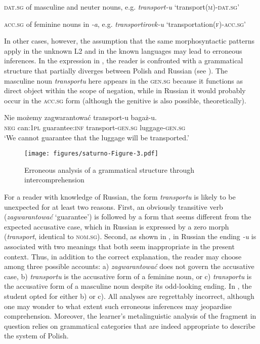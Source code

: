 \documentclass[output=paper,            colorlinks, citecolor=brown            		  ]{langscibook}
\begin{document}
\ea\label{ex:saturno:11}
\ea\label{ex:saturno:11a}
\textsc{dat.sg} of masculine and neuter nouns, e.g. \textit{transport-u} ‘transport(\textsc{m})-\textsc{dat.sg}’



  \ex\label{ex:saturno:11b}
  \textsc{acc.sg} of feminine nouns in \textit{{}-a}, e.g. \textit{transportirovk-u} ‘transportation(\textsc{f})-\textsc{acc.sg}’
  \z
\z


In other cases, however, the assumption that the same morphosyntactic patterns apply in the unknown L2 and in the known languages may lead to erroneous inferences. In the expression in , the reader is confronted with a grammatical structure that partially diverges between Polish and Russian (see ). The masculine noun \textit{transportu} here appears in the \textsc{gen.sg} because it functions as direct object within the scope of negation, while in Russian it would probably occur in the \textsc{acc.sg} form (although the genitive is also possible, theoretically).



\ea\label{ex:saturno:12}  \gll Nie  możemy  zagwarantować   transport-u     bagaż-u.\\
  \textsc{neg}  can:\textsc{1pl}  guarantee:\textsc{inf}  transport-\textsc{gen.sg}  luggage-\textsc{gen.sg}\\ 
  \glt ‘We cannot guarantee that the luggage will be transported.’
\z

\begin{figure}[b]
 \texttt{[image: figures/saturno-Figure-3.pdf]}
\caption{Erroneous analysis of a grammatical structure through intercomprehension}
\label{fig:saturno:3}
\end{figure}

For a reader with knowledge of Russian, the form \textit{transportu} is likely to be unexpected for at least two reasons. First, an obviously transitive verb (\textit{zagwarantować} ‘guarantee’) is followed by a form that seems different from the expected accusative case, which in Russian is expressed by a zero morph (\textit{transport}, identical to \textsc{nom.sg}). Second, as shown in , in Russian the ending \textit{{}-u} is associated with two meanings that both seem inappropriate in the present context. Thus, in addition to the correct explanation, the reader may choose among three possible accounts: a) \textit{zagwarantować} does not govern the accusative case, b) \textit{transportu} is the accusative form of a feminine noun, or c) \textit{transportu} is the accusative form of a masculine noun despite its odd-looking ending. In , the student opted for either b) or c). All analyses are regrettably incorrect, although one may wonder to what extent such erroneous inferences may jeopardise comprehension. Moreover, the learner’s metalinguistic analysis of the fragment in question relies on grammatical categories that are indeed appropriate to describe the system of Polish.
\end{document}
